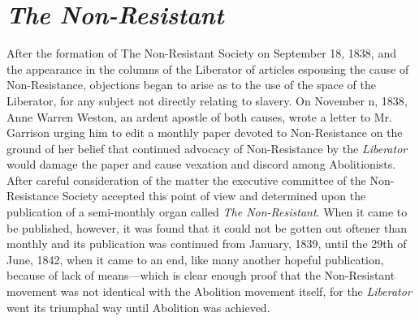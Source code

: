 \documentclass{book}
\begin{document}
\chapter{\emph{The Non-Resistant}}
\label{chapter-3}
After the formation of The Non-Resistant Society on September 18, 1838, and the appearance in the columns of the Liberator of articles espousing the cause of Non-Resistance, objections began to arise as to the use of the space of the Liberator, for any subject not directly relating to slavery. On November n, 1838, Anne Warren Weston, an ardent apostle of both causes, wrote a letter to Mr. Garrison urging him to edit a monthly paper devoted to Non-Resistance on the ground of her belief that continued advocacy of Non-Resistance by the \emph{Liberator} would damage the paper and cause vexation and discord among Abolitionists. After careful consideration of the matter the executive committee of the Non-Resistance Society accepted this point of view and determined upon the publication of a semi-monthly organ called \emph{The Non-Resistant}. When it came to be published, however, it was found that it could not be gotten out oftener than monthly and its publication was continued from January, 1839, until the 29th of June, 1842, when it came to an end, like many another hopeful publication, because of lack of means—which is clear enough proof that the Non-Resistant movement was not identical with the Abolition movement itself, for the \emph{Liberator} went its triumphal way until Abolition was achieved.
\end{document}
